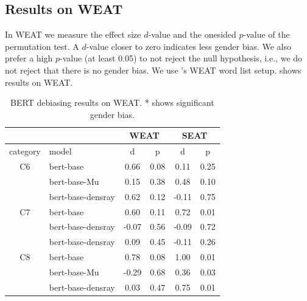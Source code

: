 
\subsection{Results on WEAT}
In WEAT we measure the effect size $d$-value and the
onesided $p$-value of the permutation test.  A $d$-value
closer to zero indicates less gender bias.  We also prefer a
high $p$-value (at least 0.05) to not reject the null
hypothesis, i.e., we do not reject that there is no gender
bias. We use \cite{karve2019conceptor}'s WEAT word list
setup.
 shows
results on WEAT.




\begin{table}[ht]
\centering
\scriptsize
\begin{tabular}{clcccc}
\hline
&&\multicolumn{2}{c}{WEAT}&\multicolumn{2}{c}{SEAT}\\
\hline
category & model & d & p& d & p\\
\hline
C6 & bert-base & 0.66 & 0.08 &0.11&0.25\\
& bert-base-Mu & 0.15 & 0.38&0.48&0.10\\
&bert-base-densray & 0.62 & 0.12&-0.11&0.75\\
\hline
C7 & bert-base & 0.60 & 0.11 &0.72&0.01\\
& bert-base-densray & -0.07 & 0.56&-0.09&0.72\\
& bert-base-densray & 0.09 & 0.45&-0.11&0.26\\
\hline
C8& bert-base & 0.78 & 0.08 &1.00&0.01\\
& bert-base-Mu & -0.29 & 0.68&0.36&0.03\\
& bert-base-densray & 0.03 & 0.47&0.75&0.01\\

\hline
\end{tabular}
\caption{
BERT debiasing results on WEAT. * shows significant gender bias.}
\end{table}

